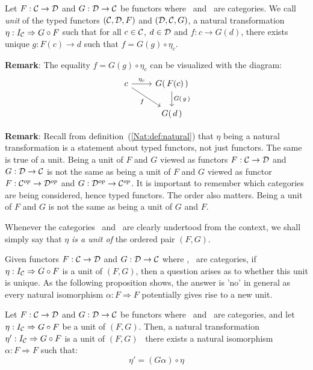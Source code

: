 \begin{defin}\label{Adj:def:unit}
    Let $F:\mbox{$\cal C$}\to\mbox{$\cal D$}$ and $G:\mbox{$\cal D$}\to\mbox{$\cal C$}$ be functors where \Cat\ and \Dat\ 
    are categories. We call {\em unit} of the typed functors $(\mbox{$\cal C$},\mbox{$\cal D$},F)$
    and $(\mbox{$\cal D$},\mbox{$\cal C$},G)$, a natural transformation 
    $\eta:I_{\cal C}\Rightarrow G\circ F$ such that for all 
    $c\in\mbox{$\cal C$}$, $d\in\mbox{$\cal D$}$ and $f:c\to G(d)$, there exists 
    unique $g:F(c) \to d$ such that $f = G(g) \circ \eta_{c}$.
\end{defin}

\noindent
{\bf Remark}: The equality $f = G(g) \circ \eta_{c}$ can be visualized with
the diagram:
    \[
        \begin{tikzcd}
            c \arrow[rd,swap, "f"]\arrow[r,"\eta_{c}"] 
            &G(\,F(c)\,)\arrow[d,"G(\,g\,)"]\\
            & G(\,d\,)
        \end{tikzcd}
    \]

\noindent
{\bf Remark}: Recall from definition~(\ref{Nat:def:natural}) that $\eta$ being
a natural transformation is a statement about typed functors, not just functors. 
The same is true of a unit. Being a unit of $F$ and $G$ viewed as functors 
$F:\mbox{$\cal C$}\to\mbox{$\cal D$}$ and $G:\mbox{$\cal D$}\to\mbox{$\cal C$}$ is not the same as being a unit of $F$ 
and $G$ viewed as functor $F:\mbox{${\cal C}^{op}$}\to\mbox{${\cal D}^{op}$}$ and $G:\mbox{${\cal D}^{op}$}\to\mbox{${\cal C}^{op}$}$. It is important
to remember which categories are being considered, hence typed functors. The
order also matters. Being a unit of $F$ and $G$ is not the same as being a unit
of $G$ and $F$.

\begin{notation}\label{Adj:notation:unit}
    Whenever the categories \Cat\ and \Dat\ are clearly undertood from the 
    context, we shall simply say that $\eta$ {\em is a unit of} the
    ordered pair $(F,G)$.
\end{notation}

Given functors $F:\mbox{$\cal C$}\to\mbox{$\cal D$}$ and $G:\mbox{$\cal D$}\to\mbox{$\cal C$}$ where \Cat, \Dat\ are 
categories, if $\eta:I_{\cal C}\Rightarrow G\circ F$ is a unit of $(F,G)$,
then a question arises as to whether this unit is unique. As the following
proposition shows, the answer is 'no' in general as every natural 
isomorphism $\alpha : F\Rightarrow F$ potentially gives rise to a 
new unit.

\begin{prop}\label{Adj:prop:unit:not:unique}
    Let $F:\mbox{$\cal C$}\to\mbox{$\cal D$}$ and $G:\mbox{$\cal D$}\to\mbox{$\cal C$}$ be functors where \Cat\ and \Dat\ 
    are categories, and let $\eta:I_{\cal C}\Rightarrow G\circ F$ be a unit
    of $(F,G)$. Then, a natural transformation $\eta':I_{\cal C}\Rightarrow 
    G\circ F$ is a unit of $(F,G)$ \ifand\ there exists a natural isomorphism 
    $\alpha:F\Rightarrow F$ such that:
        \[
            \eta'=(G\alpha)\circ\eta
        \]
\end{prop}
